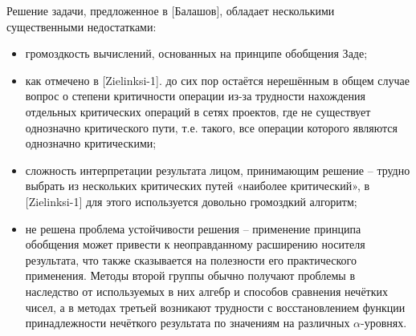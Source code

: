 Решение задачи, предложенное в [Балашов], обладает несколькими существенными недостатками:
\begin{itemize}
  \item громоздкость вычислений, основанных на принципе обобщения Заде;
  \item как отмечено в [Zielinksi-1]. до сих пор остаётся нерешённым в общем случае вопрос о степени критичности операции из-за трудности нахождения отдельных критических операций в сетях проектов, где не существует однозначно критического пути, т.е. такого, все операции которого являются однозначно критическими;
  \item сложность интерпретации результата лицом, принимающим решение – трудно выбрать из нескольких критических путей «наиболее критический», в [Zielinksi-1] для этого используется довольно громоздкий алгоритм;
  \item не решена проблема устойчивости решения – применение принципа обобщения может привести к неоправданному расширению носителя результата, что также сказывается на полезности его практического применения.
Методы второй группы обычно получают проблемы в наследство от используемых в них алгебр и способов сравнения нечётких чисел, а в методах третьей возникают трудности с восстановлением функции принадлежности нечёткого результата по значениям на различных $\alpha$-уровнях.
\end{itemize}